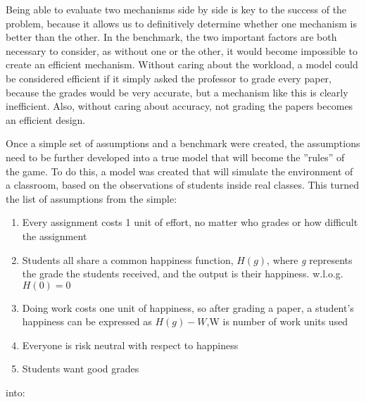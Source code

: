 \documentclass[12pt, Arial]{article}
\begin{document}
Being able to evaluate two mechanisms side by side is key to the success of the problem, because it allows us to definitively determine whether one mechanism is better than the other. In the benchmark, the two important factors are both necessary to consider, as  without one or the other, it would become impossible to create an efficient mechanism. Without caring about the workload, a model could be considered efficient if it simply asked the professor to grade every paper, because the grades would be very accurate, but a mechanism like this is clearly inefficient. Also, without caring about accuracy, not grading the papers becomes an efficient design.

Once a simple set of assumptions and a benchmark were created, the assumptions need to be further developed into a true model that will become the ''rules'' of the game. To do this, a model was created that will simulate the environment of a classroom, based on the observations of students inside real classes. This turned the list of assumptions from the simple: 
\begin{enumerate}
  \item Every assignment costs 1 unit of effort, no matter who grades or how difficult the assignment
  \item Students all share a common happiness function, $H(g)$, where \emph{g} represents the grade the students received, and the output is their happiness. w.l.o.g. $H(0)=0$
  \item Doing work costs one unit of happiness, so after grading a paper, a student's happiness can be expressed as $H(g)-W$,W is number of work units used
  \item Everyone is risk neutral with respect to happiness
  \item Students want good grades
\end{enumerate}
into:
\end{document}
